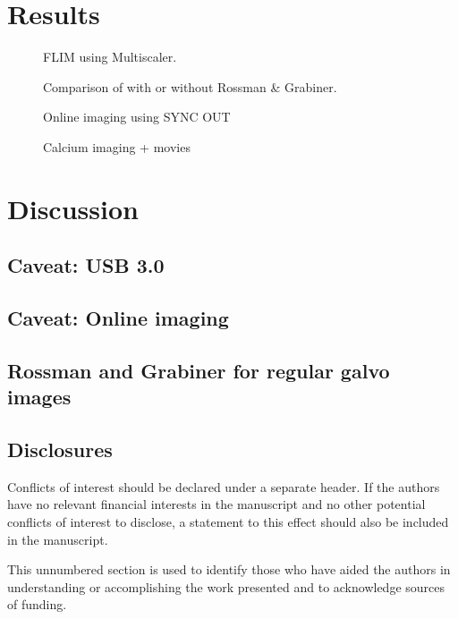 \documentclass[12pt]{spieman}  %
\begin{document}
\begin{spacing}{2}
\section{Results}
\label{sect:results}

\begin{figure}
\caption{FLIM using Multiscaler.}
\end{figure}

\begin{figure}
\caption{Comparison of with or without Rossman \& Grabiner.}
\end{figure}

\begin{figure}
\caption{Online imaging using SYNC OUT}
\end{figure}

\begin{figure}
\caption{Calcium imaging + movies}
\end{figure}

\section{Discussion}
\label{sect:discussion}

\subsection{Caveat: USB 3.0}

\subsection{Caveat: Online imaging}

\subsection{Rossman and Grabiner for regular galvo images}


\appendix    %

\subsection*{Disclosures}
Conflicts of interest should be declared under a separate header. If the authors have no relevant financial interests in the manuscript and no other potential conflicts of interest to disclose, a statement to this effect should also be included in the manuscript.

\acknowledgments 
This unnumbered section is used to identify those who have aided the authors in understanding or accomplishing the work presented and to acknowledge sources of funding.  


\end{spacing}
\end{document}
